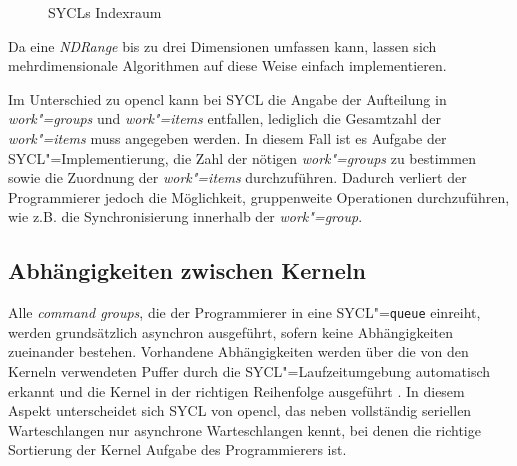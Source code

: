 \begin{figure}
    \caption{SYCLs Indexraum \cite[nach][25]{opencl2012}}
    \label{sycl:konzepte:abstraktion:ndrange}
\end{figure}

Da eine \textit{NDRange} bis zu drei Dimensionen umfassen kann, lassen sich
mehrdimensionale Algorithmen auf diese Weise einfach implementieren.

Im Unterschied zu \gls{opencl} kann bei SYCL die Angabe der Aufteilung in
\textit{work"=groups} und \textit{work"=items} entfallen, lediglich die
Gesamtzahl der \textit{work"=items} muss angegeben werden. In diesem Fall ist
es Aufgabe der SYCL"=Implementierung, die Zahl der nötigen \textit{work"=groups}
zu bestimmen sowie die Zuordnung der \textit{work"=items} durchzuführen. Dadurch
verliert der Programmierer jedoch die Möglichkeit, gruppenweite Operationen
durchzuführen, wie z.B. die Synchronisierung innerhalb der \textit{work"=group}.

\subsection{Abhängigkeiten zwischen Kerneln}
\label{sycl:konzepte:abhaengigkeiten}

Alle \textit{command groups}, die der Programmierer in eine
SYCL"=\texttt{queue} einreiht, werden grundsätzlich asynchron ausgeführt, sofern
keine Abhängigkeiten zueinander bestehen. Vorhandene Abhängigkeiten werden über
die von den Kerneln verwendeten Puffer durch die SYCL"=Laufzeitumgebung
automatisch erkannt und die Kernel in der richtigen Reihenfolge ausgeführt
\cite[vgl.][21--23]{sycl2019}. In diesem Aspekt unterscheidet sich SYCL von
\gls{opencl}, das neben vollständig seriellen Warteschlangen nur asynchrone
Warteschlangen kennt, bei denen die richtige Sortierung der Kernel Aufgabe des
Programmierers ist.

